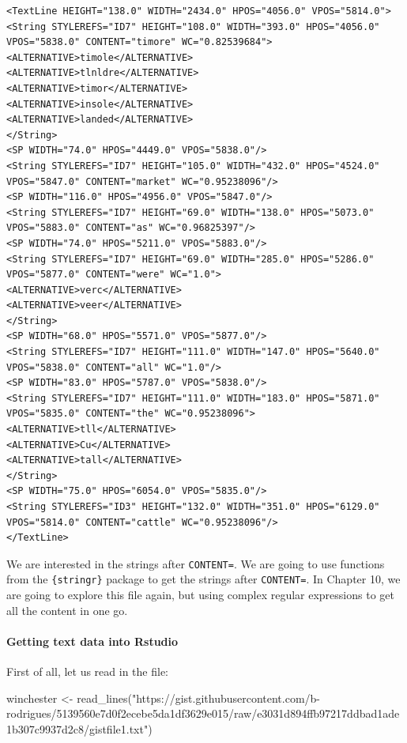 \documentclass[
]{article}
\newenvironment{Shaded}{\begin{snugshade}}{\end{snugshade}}
\newcommand{\FunctionTok}[1]{\textcolor[rgb]{0.00,0.00,0.00}{#1}}
\newcommand{\NormalTok}[1]{#1}
\newcommand{\OtherTok}[1]{\textcolor[rgb]{0.56,0.35,0.01}{#1}}
\newcommand{\StringTok}[1]{\textcolor[rgb]{0.31,0.60,0.02}{#1}}
\begin{document}
\begin{verbatim}
<TextLine HEIGHT="138.0" WIDTH="2434.0" HPOS="4056.0" VPOS="5814.0">
<String STYLEREFS="ID7" HEIGHT="108.0" WIDTH="393.0" HPOS="4056.0" VPOS="5838.0" CONTENT="timore" WC="0.82539684">
<ALTERNATIVE>timole</ALTERNATIVE>
<ALTERNATIVE>tlnldre</ALTERNATIVE>
<ALTERNATIVE>timor</ALTERNATIVE>
<ALTERNATIVE>insole</ALTERNATIVE>
<ALTERNATIVE>landed</ALTERNATIVE>
</String>
<SP WIDTH="74.0" HPOS="4449.0" VPOS="5838.0"/>
<String STYLEREFS="ID7" HEIGHT="105.0" WIDTH="432.0" HPOS="4524.0" VPOS="5847.0" CONTENT="market" WC="0.95238096"/>
<SP WIDTH="116.0" HPOS="4956.0" VPOS="5847.0"/>
<String STYLEREFS="ID7" HEIGHT="69.0" WIDTH="138.0" HPOS="5073.0" VPOS="5883.0" CONTENT="as" WC="0.96825397"/>
<SP WIDTH="74.0" HPOS="5211.0" VPOS="5883.0"/>
<String STYLEREFS="ID7" HEIGHT="69.0" WIDTH="285.0" HPOS="5286.0" VPOS="5877.0" CONTENT="were" WC="1.0">
<ALTERNATIVE>verc</ALTERNATIVE>
<ALTERNATIVE>veer</ALTERNATIVE>
</String>
<SP WIDTH="68.0" HPOS="5571.0" VPOS="5877.0"/>
<String STYLEREFS="ID7" HEIGHT="111.0" WIDTH="147.0" HPOS="5640.0" VPOS="5838.0" CONTENT="all" WC="1.0"/>
<SP WIDTH="83.0" HPOS="5787.0" VPOS="5838.0"/>
<String STYLEREFS="ID7" HEIGHT="111.0" WIDTH="183.0" HPOS="5871.0" VPOS="5835.0" CONTENT="the" WC="0.95238096">
<ALTERNATIVE>tll</ALTERNATIVE>
<ALTERNATIVE>Cu</ALTERNATIVE>
<ALTERNATIVE>tall</ALTERNATIVE>
</String>
<SP WIDTH="75.0" HPOS="6054.0" VPOS="5835.0"/>
<String STYLEREFS="ID3" HEIGHT="132.0" WIDTH="351.0" HPOS="6129.0" VPOS="5814.0" CONTENT="cattle" WC="0.95238096"/>
</TextLine>
\end{verbatim}

We are interested in the strings after \texttt{CONTENT=}. We are going to use functions from the \texttt{\{stringr\}}
package to get the strings after \texttt{CONTENT=}. In Chapter 10, we are going to explore this file
again, but using complex regular expressions to get all the content in one go.

\hypertarget{getting-text-data-into-rstudio}{%
\paragraph{Getting text data into Rstudio}\label{getting-text-data-into-rstudio}}

First of all, let us read in the file:

\begin{Shaded}
\begin{Highlighting}[]
\NormalTok{winchester }\OtherTok{\textless{}{-}} \FunctionTok{read\_lines}\NormalTok{(}\StringTok{"https://gist.githubusercontent.com/b{-}rodrigues/5139560e7d0f2ecebe5da1df3629e015/raw/e3031d894ffb97217ddbad1ade1b307c9937d2c8/gistfile1.txt"}\NormalTok{)}
\end{Highlighting}
\end{Shaded}
\end{document}
